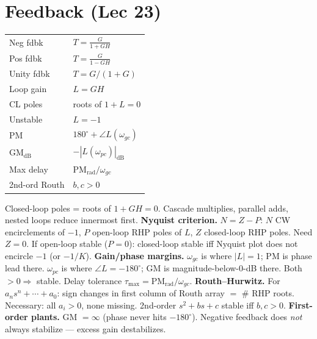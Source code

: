\documentclass[11pt]{extarticle}
\begin{document}
\section*{Feedback (Lec 23)}

\begin{table}
  \begin{tabular}{@{}l l@{}}
    \toprule
    Neg fdbk & $T{=}\tfrac{G}{1+GH}$ \\
    Pos fdbk & $T{=}\tfrac{G}{1-GH}$ \\
    Unity fdbk & $T{=}G/(1{+}G)$ \\
    Loop gain & $L{=}GH$ \\
    CL poles & roots of $1{+}L{=}0$ \\
    Unstable & $L{=}{-}1$ \\
    PM & $180^\circ{+}\angle L(\omega_{gc})$ \\
    GM$_\mathrm{dB}$ & ${-}|L(\omega_{pc})|_\mathrm{dB}$ \\
    Max delay & $\mathrm{PM}_\mathrm{rad}/\omega_{gc}$ \\
    2nd-ord Routh & $b,c{>}0$ \\
    \bottomrule
  \end{tabular}
\end{table}
Closed-loop poles = roots of $1+GH=0$. Cascade multiplies, parallel adds, nested loops reduce innermost first.
\textbf{Nyquist criterion.} $N=Z-P$: $N$ CW encirclements of $-1$, $P$ open-loop RHP poles of $L$, $Z$ closed-loop RHP poles. Need $Z=0$. If open-loop stable ($P=0$): closed-loop stable iff Nyquist plot does not encircle $-1$ (or $-1/K$).
\textbf{Gain/phase margins.} $\omega_{gc}$ is where $|L|=1$; PM is phase lead there. $\omega_{pc}$ is where $\angle L=-180^\circ$; GM is magnitude-below-0-dB there. Both $>0 \Rightarrow$ stable. Delay tolerance $\tau_{\max}=\mathrm{PM}_\mathrm{rad}/\omega_{gc}$.
\textbf{Routh--Hurwitz.} For $a_n s^n+\cdots+a_0$: sign changes in first column of Routh array $=$ \# RHP roots. Necessary: all $a_i>0$, none missing. 2nd-order $s^2+bs+c$ stable iff $b,c>0$.
\textbf{First-order plants.} GM $=\infty$ (phase never hits $-180^\circ$). Negative feedback does \emph{not} always stabilize --- excess gain destabilizes.

\FloatBarrier
\bigskip

\end{document}
